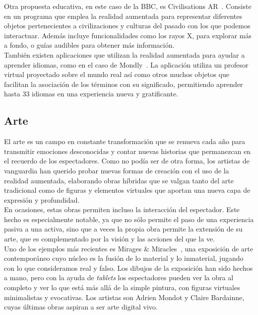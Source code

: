  Otra propuesta educativa, en este caso de la BBC, es Civilisations AR~\cite{Xat11Apps}. Consiste en un programa que emplea la realidad aumentada para representar diferentes objetos pertenecientes a civilizaciones y culturas del pasado con los que podemos interactuar. Además incluye funcionalidades como los rayos X, para explorar más a fondo, o guías audibles para obtener más información.\\
 
 También existen aplicaciones que utilizan la realidad aumentada para ayudar a aprender idiomas, como en el caso de Mondly~\cite{Xat11Apps}. La aplicación utiliza un profesor virtual proyectado sobre el mundo real así como otros muchos objetos que facilitan la asociación de los términos con su significado, permitiendo aprender hasta 33 idiomas en una experiencia nueva y gratificante.

\subsection{Arte}
El arte es un campo en constante transformación que se renueva cada año para transmitir emociones desconocidas y contar nuevas historias que permanezcan en el recuerdo de los espectadores. Como no podía ser de otra forma, los artistas de vanguardia han querido probar nuevas formas de creación con el uso de la realidad aumentada, elaborando obras híbridas que se valgan tanto del arte tradicional como de figuras y elementos virtuales que aportan una nueva capa de expresión y profundidad.\\

En ocasiones, estas obras permiten incluso la interacción del espectador. Este hecho es especialmente notable, ya que no sólo permite el paso de una experiencia pasiva a una activa, sino que a veces la propia obra permite la extensión de su arte, que es complementado por la visión y las acciones del que la ve.\\

Uno de los ejemplos más recientes es Mirages \& Miracles~\cite{elemmental}, una exposición de arte contemporáneo cuyo núcleo es la fusión de lo material y lo inmaterial, jugando con lo que consideramos real y falso. Los dibujos de la exposición han sido hechos a mano, pero con la ayuda de \textit{tablets} los espectadores pueden ver la obra al completo y ver lo que está más allá de la simple pintura, con figuras virtuales minimalistas y evocativas. Los artistas son Adrien Mondot y Claire Bardainne, cuyas últimas obras aspiran a ser arte digital vivo.

